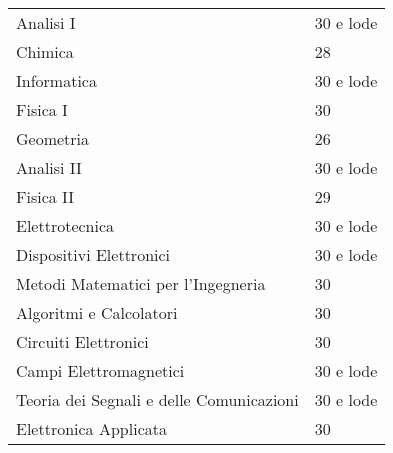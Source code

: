 \fontsize{9pt}{1em}\bodyfontlight\upshape\color{text}
\renewcommand{\arraystretch}{1.5}
  \begin{tabularx}{\textwidth}{X X}
  Analisi I & 30 e lode \\
  Chimica & 28 \\
  Informatica & 30 e lode \\
  Fisica I & 30 \\
  Geometria & 26 \\
  Analisi II & 30 e lode \\
  Fisica II & 29 \\
  Elettrotecnica & 30 e lode \\
  Dispositivi Elettronici & 30 e lode \\
  Metodi Matematici per l'Ingegneria & 30 \\
  Algoritmi e Calcolatori & 30 \\
  Circuiti Elettronici & 30 \\
  Campi Elettromagnetici & 30 e lode \\
  Teoria dei Segnali e delle Comunicazioni & 30 e lode \\
  Elettronica Applicata & 30 \\
  \end{tabularx}


